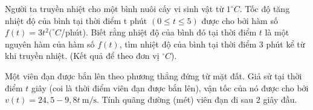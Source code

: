 \begin{bt}%
	Người ta truyền nhiệt cho một bình nuôi cấy vi sinh vật từ $1^\circ C$. Tốc độ tăng nhiệt độ của bình tại thời điểm t phút $(0\le t\le 5)$ được cho bởi hàm số $f(t)=3t^2 (^\circ C$/phút). Biết rằng nhiệt độ của bình đó tại thời điểm $t$ là một nguyên hàm của hàm số $f(t)$, tìm nhiệt độ của bình  tại thời điểm $ 3$ phút kể từ khi truyền nhiệt. (Kết quả để theo đơn vị $^\circ C$).
\end{bt}

\begin{bt}%
	Một  viên đạn được bắn lên theo phương thẳng đứng từ mặt đất. Giả sử tại thời điểm $t$ giây (coi là thời điểm viên đạn được bắn lên), vận tốc của nó được cho bởi $v(t)=24{,}5-9{,}8t~\mathrm{m/s}$. Tính quãng đường (mét) viên đạn đi sau $2$ giây đầu.
\end{bt}

